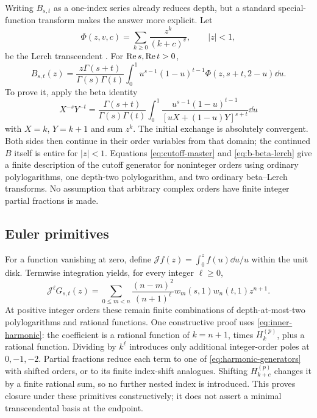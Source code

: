Writing $B_{s,t}$ as a one-index series already reduces depth, but a
standard special-function transform makes the answer more explicit.
Let
\[
 \Phi(z,v,c)=\sum_{k\ge0}\frac{z^k}{(k+c)^v},\qquad |z|<1,
\]
be the Lerch transcendent \cite{dlmf:lerch}. For $\operatorname{Re} s,\operatorname{Re} t>0$,
\begin{equation}\label{eq:b-beta-lerch}
 B_{s,t}(z)=\frac{z\Gamma(s+t)}{\Gamma(s)\Gamma(t)}
 \int_0^1u^{s-1}(1-u)^{t-1}
       \Phi(z,s+t,2-u)\dd u.
\end{equation}
To prove it, apply the beta identity
\begin{equation}\label{eq:feynman-basic}
 X^{-s}Y^{-t}=\frac{\Gamma(s+t)}{\Gamma(s)\Gamma(t)}
 \int_0^1\frac{u^{s-1}(1-u)^{t-1}}{[uX+(1-u)Y]^{s+t}}\dd u
\end{equation}
with $X=k$, $Y=k+1$ and sum $z^k$. The initial exchange is absolutely
convergent. Both sides then continue in their order variables from
that domain; the continued $B$ itself is entire for $|z|<1$.
Equations \eqref{eq:cutoff-master} and \eqref{eq:b-beta-lerch}
give a finite description of the cutoff generator for noninteger
orders using ordinary polylogarithms, one depth-two polylogarithm,
and two ordinary beta--Lerch transforms. No assumption that arbitrary
complex orders have finite integer partial fractions is made.

\subsection{Euler primitives}

For a function vanishing at zero, define
$\mathcal J f(z)=\int_0^z f(u)\dd u/u$ within the unit disk.
Termwise integration yields, for every integer $\ell\ge0$,
\begin{equation}\label{eq:euler-primitives}
 \mathcal J^\ell G_{s,t}(z)
 =\sum_{0\le m<n}\frac{(n-m)^2}{(n+1)^\ell}
             w_m(s,1)w_n(t,1)z^{n+1}.
\end{equation}
At positive integer orders these remain finite combinations of
depth-at-most-two polylogarithms and rational functions. One constructive
proof uses \eqref{eq:inner-harmonic}: the coefficient is a rational
function of $k=n+1$, times $H_k^{(p)}$, plus a rational function.
Dividing by $k^\ell$ introduces only additional integer-order poles
at $0,-1,-2$. Partial fractions reduce each term to one of
\eqref{eq:harmonic-generators} with shifted orders, or to its finite
index-shift analogues. Shifting $H_{k+c}^{(p)}$ changes it by a
finite rational sum, so no further nested index is introduced.
This proves closure under these primitives constructively; it does
not assert a minimal transcendental basis at the endpoint.
